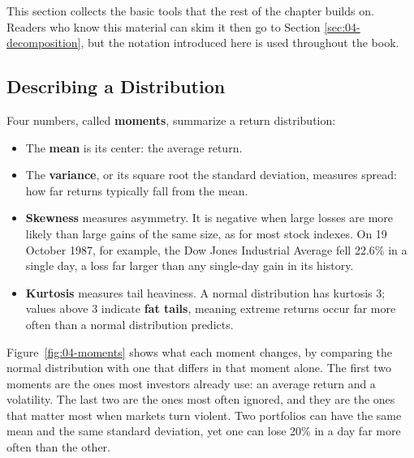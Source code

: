 This section collects the basic tools that the rest of the chapter builds on.
Readers who know this material can skim it then go to Section \ref{sec:04-decomposition}, but the notation introduced here is used throughout the book.

\subsection{Describing a Distribution}
Four numbers, called \textbf{moments}, summarize a return distribution:
\begin{itemize}
  \item The \textbf{mean} is its center: the average return.
  \item The \textbf{variance}, or its square root the standard deviation, measures spread: how far returns typically fall from the mean.
  \item \textbf{Skewness} measures asymmetry. It is negative when large losses are more likely than large gains of the same size, as for most stock indexes. On 19 October 1987, for example, the Dow Jones Industrial Average fell 22.6\% in a single day, a loss far larger than any single-day gain in its history.
  \item \textbf{Kurtosis} measures tail heaviness. A normal distribution has kurtosis 3; values above 3 indicate \textbf{fat tails}, meaning extreme returns occur far more often than a normal distribution predicts.
\end{itemize}

Figure~\ref{fig:04-moments} shows what each moment changes, by comparing the normal distribution with one that differs in that moment alone. The first two moments are the ones most investors already use: an average return and a volatility. The last two are the ones most often ignored, and they are the ones that matter most when markets turn violent. Two portfolios can have the same mean and the same standard deviation, yet one can lose 20\% in a day far more often than the other.


